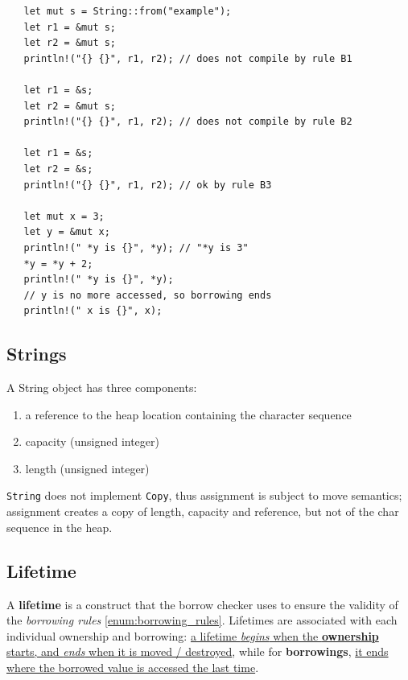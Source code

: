 \begin{lstlisting}
   let mut s = String::from("example");
   let r1 = &mut s;
   let r2 = &mut s;
   println!("{} {}", r1, r2); // does not compile by rule B1

   let r1 = &s;
   let r2 = &mut s;
   println!("{} {}", r1, r2); // does not compile by rule B2
   
   let r1 = &s;
   let r2 = &s;
   println!("{} {}", r1, r2); // ok by rule B3

   let mut x = 3; 
   let y = &mut x;
   println!(" *y is {}", *y); // "*y is 3"
   *y = *y + 2;
   println!(" *y is {}", *y);
   // y is no more accessed, so borrowing ends
   println!(" x is {}", x);
\end{lstlisting}

\subsection{Strings}

{A String object has three components:\ns
\begin{enumerate}
   \item a reference to the heap location containing the character sequence
   \item capacity (unsigned integer)
   \item length (unsigned integer)
\end{enumerate}}
\lstinline|String| does not implement \lstinline|Copy|, thus assignment is subject to move semantics;
assignment creates a copy of length, capacity and reference,
but not of the char sequence in the heap.

\subsection{Lifetime}
A \textbf{lifetime} is a construct that the borrow checker uses to ensure the validity of the \textit{borrowing rules} \ref{enum:borrowing_rules}.
Lifetimes are associated with each individual ownership
and borrowing: 
\ul{a lifetime \textit{begins} when the \textbf{ownership} starts, and \textit{ends}
when it is moved / destroyed}, 
while for \textbf{borrowings}, \ul{it ends where the borrowed value is
accessed the last time}.

